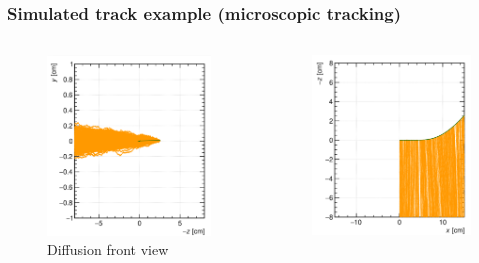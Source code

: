 \documentclass{beamer}
\begin{document}
	\begin{frame}
		\frametitle{Simulated track example (microscopic tracking)}		
		\begin{columns}
			\begin{figure}
				\centering
				\includegraphics[width = 0.95 \linewidth]{images/track1.png}
				\caption{Diffusion front view}
			\end{figure}
			\begin{figure}
				\centering
				\includegraphics[width = 0.95 \linewidth]{images/track2.png}

\end{figure}
\end{columns}
\end{frame}
\end{document}
